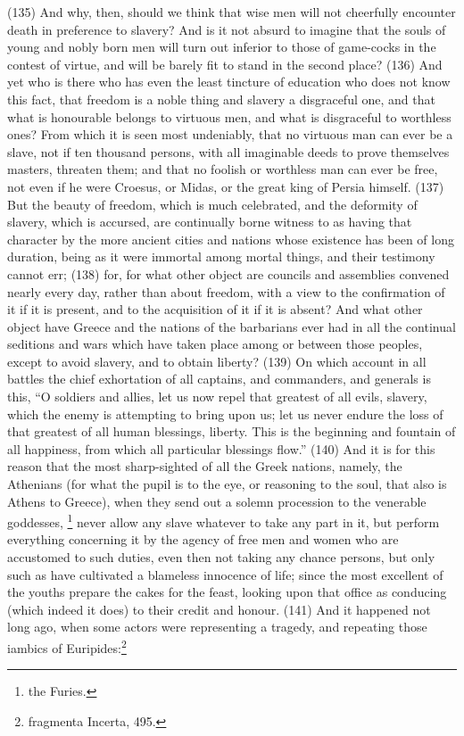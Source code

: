 (135) And why, then, should we think that wise men will not cheerfully encounter death in
preference to slavery? And is it not absurd to imagine that the souls of young and nobly born men
will turn out inferior to those of game-cocks in the contest of virtue, and will be barely fit to stand in
the second place? (136) And yet who is there who has even the least tincture of education who
does not know this fact, that freedom is a noble thing and slavery a disgraceful one, and that what
is honourable belongs to virtuous men, and what is disgraceful to worthless ones? From which it is
seen most undeniably, that no virtuous man can ever be a slave, not if ten thousand persons, with
all imaginable deeds to prove themselves masters, threaten them; and that no foolish or worthless
man can ever be free, not even if he were Croesus, or Midas, or the great king of Persia himself.
(137) But the beauty of freedom, which is much celebrated, and the deformity of slavery, which is
accursed, are continually borne witness to as having that character by the more ancient cities and
nations whose existence has been of long duration, being as it were immortal among mortal things,
and their testimony cannot err; (138) for, for what other object are councils and assemblies
convened nearly every day, rather than about freedom, with a view to the confirmation of it if it is
present, and to the acquisition of it if it is absent? And what other object have Greece and the
nations of the barbarians ever had in all the continual seditions and wars which have taken place
among or between those peoples, except to avoid slavery, and to obtain liberty? (139) On which
account in all battles the chief exhortation of all captains, and commanders, and generals is this,
``O soldiers and allies, let us now repel that greatest of all evils, slavery, which the enemy is
attempting to bring upon us; let us never endure the loss of that greatest of all human blessings,
liberty. This is the beginning and fountain of all happiness, from which all particular blessings flow.''
(140) And it is for this reason that the most sharp-sighted of all the Greek nations, namely, the
Athenians (for what the pupil is to the eye, or reasoning to the soul, that also is Athens to Greece),
when they send out a solemn procession to the venerable goddesses, \footnote{the Furies.} never allow
any slave whatever to take any part in it, but perform everything concerning it by the agency of free
men and women who are accustomed to such duties, even then not taking any chance persons,
but only such as have cultivated a blameless innocence of life; since the most excellent of the
youths prepare the cakes for the feast, looking upon that office as conducing (which indeed it
does) to their credit and honour. (141) And it happened not long ago, when some actors were
representing a tragedy, and repeating those iambics of Euripides:\footnote{fragmenta Incerta, 495.}

